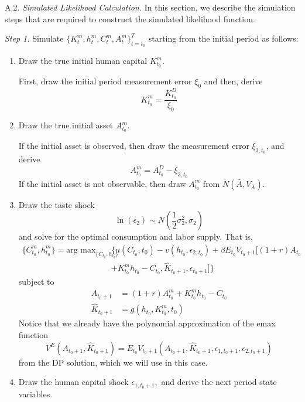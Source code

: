 \documentclass{article}
\begin{document}
\quad A.2.     \textit{Simulated Likelihood Calculation.}     In this section, we describe the simulation steps that are required to construct the simulated likelihood function. \par
\medskip
\noindent \textit{Step 1.}      Simulate $\{K_t^m, h_t^m, C_t^m, A_t^m\}_{t=t_0}^T$ starting from the initial period as follows:
\begin{enumerate}
\item  Draw the true initial human capital $K_{t_0}^m$. \par
  First, draw the initial period measurement error $\xi_0$ and then, derive
  $$K_{t_0}^m = \dfrac{K_{t_0}^D}{\xi_0}$$
  \item  Draw the true initial asset $A_{t_0}^m$. \par
    If the initial asset is observed, then draw the measurement error $\xi_{3,t_0}$, and derive
    $$A_{t_0}^m =A_{t_0}^D - \xi_{3,t_0} $$
    If the initial asset is not observable, then draw $A_{t_0}^m$ from $N(\bar{A}, V_{\bar{A}})$.
  \item Draw the taste shock
    $$ \ln(\epsilon_2) \sim N(\frac{1}{2}\sigma_2^2,\sigma_2) $$
      and solve for the optimal consumption and labor supply. That is,
      \begin{equation*}
        \begin{split}
          \{C_{t_0}^m,h_{t_0}^m\} = \text{arg max}_{ \{C_{t_0},h_{t_0}\} }& \{u(C_{t_0},t_0) - v(h_{t_0}, \epsilon_{2,t_0}) + \beta E_{t_0} V_{t_0+1}[(1+r)A_{t_0} \\
          & + K_{t_0}^m h_{t_0} - C_{t_0}, \hat{K}_{t_0 + 1}, \epsilon_{t_0 + 1}]\}
        \end{split}
        \end{equation*}
        subject to
        \begin{equation*}
        \begin{split}
          A_{t_0+1} & = (1+r)A_{t_0}^m + K_{t_0}^m h_{t_0} - C_{t_0} \\
          \hat{K}_{t_0+1}& = g(h_{t_0},  K_{t_0}^m, t_0)
        \end{split}
      \end{equation*}
      Notice that we already have the polynomial approximation of the emax function
      $$V^E ( A_{t_0+1},\hat{K}_{t_0 + 1}) = E_{t_0}V_{t_0 + 1}(A_{t_0+1},\hat{K}_{t_0 + 1}, \epsilon_{1,t_0+1}, \epsilon_{2,t_0+1})$$
      from the DP solution, which we will use in this case.
    \item Draw the human capital shock $\epsilon_{1,t_0+1},$ and derive the next period state variables.\par

\end{enumerate}
\end{document}

